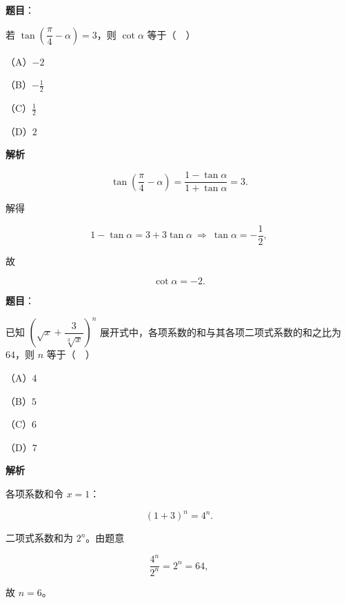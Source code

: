 \begin{answer}

\textbf{题目}：

若 $\tan\left(\dfrac{\pi}{4}-\alpha\right)=3$，则 $\cot\alpha$ 等于（　）

（A）$-2$

（B）$-\frac12$

（C）$\frac12$

（D）$2$

\textbf{解析}

\nopagebreak[4]
\[\tan\left(\frac{\pi}{4}-\alpha\right)=\frac{1-\tan\alpha}{1+\tan\alpha}=3.\]

解得

\nopagebreak[4]
\[1-\tan\alpha=3+3\tan\alpha\ \Rightarrow\ \tan\alpha=-\frac12,\]

故

\nopagebreak[4]
\[\cot\alpha=-2.\]


\end{answer}
\begin{answer}

\textbf{题目}：

已知 $\left(\sqrt x+\dfrac{3}{\sqrt[3]{x}}\right)^n$ 展开式中，各项系数的和与其各项二项式系数的和之比为 $64$，则 $n$ 等于（　）

（A）$4$

（B）$5$

（C）$6$

（D）$7$

\textbf{解析}

各项系数和令 $x=1$：

\nopagebreak[4]
\[(1+3)^n=4^n.\]

二项式系数和为 $2^n$。由题意

\nopagebreak[4]
\[\frac{4^n}{2^n}=2^n=64,\]

故 $n=6$。


\end{answer}
